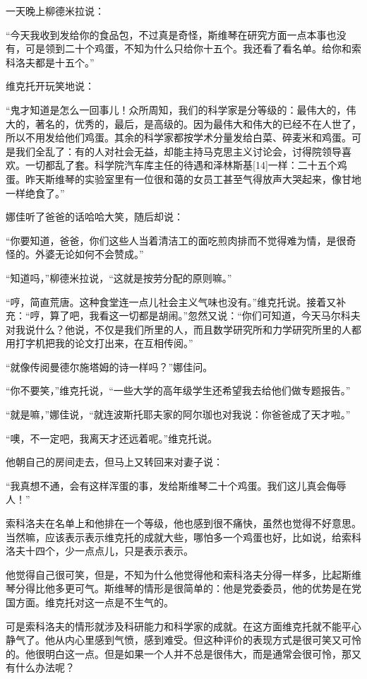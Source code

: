 一天晚上柳德米拉说：

“今天我收到发给你的食品包，不过真是奇怪，斯维琴在研究方面一点本事也没有，可是领到二十个鸡蛋，不知为什么只给你十五个。我还看了看名单。给你和索科洛夫都是十五个。”

维克托开玩笑地说：

“鬼才知道是怎么一回事儿！众所周知，我们的科学家是分等级的：最伟大的，伟大的，著名的，优秀的，最后，是高级的。因为最伟大和伟大的已经不在人世了，所以不用发给他们鸡蛋。其余的科学家都按学术分量发给白菜、碎麦米和鸡蛋。可是我们全乱了：有的人对社会无益，却能主持马克思主义讨论会，讨得院领导喜欢。一切都乱了套。科学院汽车库主任的待遇和泽林斯基[14]一样：二十五个鸡蛋。昨天斯维琴的实验室里有一位很和蔼的女员工甚至气得放声大哭起来，像甘地一样绝食了。”

娜佳听了爸爸的话哈哈大笑，随后却说：

“你要知道，爸爸，你们这些人当着清洁工的面吃煎肉排而不觉得难为情，是很奇怪的。外婆无论如何不会赞成。”

“知道吗，”柳德米拉说，“这就是按劳分配的原则嘛。”

“哼，简直荒唐。这种食堂连一点儿社会主义气味也没有。”维克托说。接着又补充：“哼，算了吧，我看这一切都是胡闹。”忽然又说：“你们可知道，今天马尔科夫对我说什么？他说，不仅是我们所里的人，而且数学研究所和力学研究所里的人都用打字机把我的论文打出来，在互相传阅。”

“就像传阅曼德尔施塔姆的诗一样吗？”娜佳问。

“你不要笑，”维克托说，“一些大学的高年级学生还希望我去给他们做专题报告。”

“就是嘛，”娜佳说，“就连波斯托耶夫家的阿尔珈也对我说：你爸爸成了天才啦。”

“噢，不一定吧，我离天才还远着呢。”维克托说。

他朝自己的房间走去，但马上又转回来对妻子说：

“我真想不通，会有这样浑蛋的事，发给斯维琴二十个鸡蛋。我们这儿真会侮辱人！”

索科洛夫在名单上和他排在一个等级，他也感到很不痛快，虽然也觉得不好意思。当然嘛，应该表示表示维克托的成就大些，哪怕多一个鸡蛋也好，比如说，给索科洛夫十四个，少一点点儿，只是表示表示。

他觉得自己很可笑，但是，不知为什么他觉得他和索科洛夫分得一样多，比起斯维琴分得比他多更可气。斯维琴的情形是很简单的：他是党委委员，他的优势是在党国方面。维克托对这一点是不生气的。

可是索科洛夫的情形就涉及科研能力和科学家的成就。在这方面维克托就不能平心静气了。他从内心里感到气愤，感到难受。但这种评价的表现方式是很可笑又可怜的。他很明白这一点。但是如果一个人并不总是很伟大，而是通常会很可怜，那又有什么办法呢？


